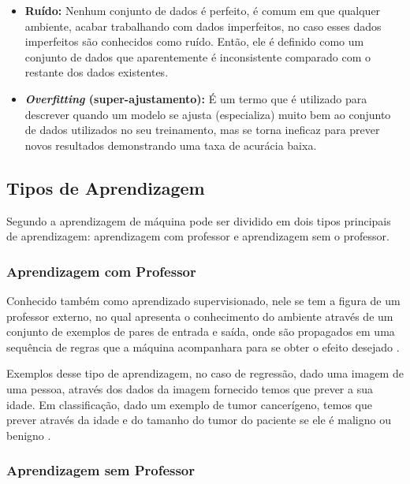 \begin{itemize}
    \item \textbf{Ruído:} Nenhum conjunto de dados é perfeito, é comum em que qualquer ambiente, acabar trabalhando com dados imperfeitos, no caso esses dados imperfeitos são conhecidos como ruído. Então, ele é definido como um conjunto de dados que aparentemente é inconsistente comparado com o restante dos dados existentes. 
    \item \textbf{\textit{Overfitting} (super-ajustamento):} É um termo que é utilizado para descrever quando um modelo se ajusta (especializa) muito bem ao conjunto de dados utilizados no seu treinamento, mas se torna ineficaz para prever novos resultados demonstrando uma taxa de acurácia baixa.
\end{itemize}

\subsection{Tipos de Aprendizagem}

\par
Segundo  a aprendizagem de máquina pode ser dividido em dois tipos principais de aprendizagem: aprendizagem com professor e aprendizagem sem o professor.

\subsubsection{Aprendizagem com Professor}

\par
Conhecido também como aprendizado supervisionado, nele se tem a figura de um professor externo, no qual apresenta o conhecimento do ambiente através de um conjunto de exemplos de pares de entrada e saída, onde são propagados em uma sequência de regras que a máquina acompanhara para se obter o efeito desejado \cite{Lorena2007, Henke2011}.

\par
Exemplos desse tipo de aprendizagem, no caso de regressão, dado uma imagem de uma pessoa, através dos dados da imagem fornecido temos que prever a sua idade. Em classificação, dado um exemplo de tumor cancerígeno, temos que prever através da idade e do tamanho do tumor do paciente se ele é maligno ou benigno \cite{Pedro}.

\subsubsection{Aprendizagem sem Professor}

